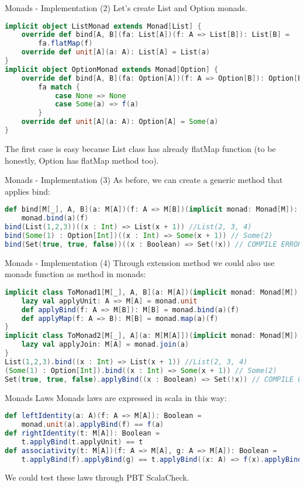 \begin{frame}[fragile]{Monads - Implementation (2)}	
	Let's create List and Option monads.
\begin{lstlisting}[language=scala]
implicit object ListMonad extends Monad[List] {
	override def bind[A, B](fa: List[A])(f: A => List[B]): List[B] =
		fa.flatMap(f)
	override def unit[A](a: A): List[A] = List(a)
}
implicit object OptionMonad extends Monad[Option] {
	override def bind[A, B](fa: Option[A])(f: A => Option[B]): Option[B] =
		fa match {
			case None => None
			case Some(a) => f(a)
		}
	override def unit[A](a: A): Option[A] = Some(a)
}		
\end{lstlisting}		
	The first case is easy because List class has already flatMap function
	(to be honestly, Option has flatMap method too).
\end{frame}

\begin{frame}[fragile]{Monads - Implementation (3)}		
	As before, we can create a generic method that applies bind:
\begin{lstlisting}[language=scala]
def bind[M[_], A, B](a: M[A])(f: A => M[B])(implicit monad: Monad[M]): M[B] = 
	monad.bind(a)(f)
bind(List(1,2,3))((x : Int) => List(x + 1)) //List(2, 3, 4)
bind(Some(1) : Option[Int])((x : Int) => Some(x + 1)) // Some(2)
bind(Set(true, true, false))((x : Boolean) => Set(!x)) // COMPILE ERROR
\end{lstlisting}	
\end{frame}

\begin{frame}[fragile]{Monads - Implementation (4)}	
	Through extension method we could also use monads function as method in monads:
\begin{lstlisting}[language=scala]
implicit class ToMonad1[M[_], A, B](a: M[A])(implicit monad: Monad[M]) {
	lazy val applyUnit: A => M[A] = monad.unit	
	def applyBind(f: A => M[B]): M[B] = monad.bind(a)(f)	
	def applyMap(f: A => B): M[B] = monad.map(a)(f)
}
implicit class ToMonad2[M[_], A](a: M[M[A]])(implicit monad: Monad[M]) {
	lazy val applyJoin: M[A] = monad.join(a)
}
List(1,2,3).bind((x : Int) => List(x + 1)) //List(2, 3, 4)
(Some(1) : Option[Int]).bind((x : Int) => Some(x + 1)) // Some(2)
Set(true, true, false).applyBind((x : Boolean) => Set(!x)) // COMPILE ERROR	
\end{lstlisting}	
\end{frame}

\begin{frame}[fragile]{Monads Laws}
	Monads laws are expressed in scala in this way:
\begin{lstlisting}[language=scala]
def leftIdentity(a: A)(f: A => M[A]): Boolean = 
	monad.unit(a).applyBind(f) == f(a)
def rightIdentity(t: M[A]): Boolean = 
	t.applyBind(t.applyUnit) == t
def associativity(t: M[A])(f: A => M[A], g: A => M[A]): Boolean =
	t.applyBind(f).applyBind(g) == t.applyBind((x: A) => f(x).applyBind(g))
\end{lstlisting}	
	We could test these laws through PBT ScalaCheck.
\end{frame}


